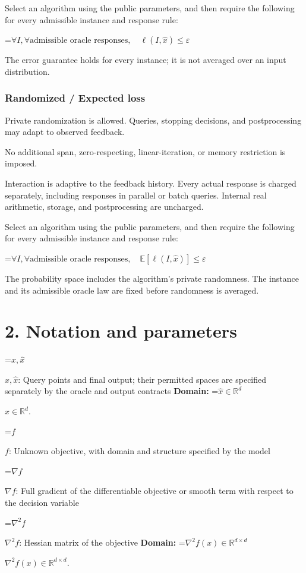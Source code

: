 \documentclass[10pt,a4paper]{article}
\newcommand{\AtlasMath}[1]{\par\begingroup\centering\setbox0=\hbox{$\displaystyle #1$}\ifdim\wd0>1.4\linewidth\typeout{ATLAS WIDE FORMULA: \the\wd0}\fi\ifdim\wd0>\linewidth\resizebox{\linewidth}{!}{\box0}\else\box0\fi\par\endgroup}
\newcommand{\AtlasInlineMath}[1]{\begingroup\setbox0=\hbox{$#1$}\ifdim\wd0>.4\linewidth\endgroup\AtlasMath{#1}\else\endgroup$#1$\fi}
\begin{document}
Select an algorithm using the public parameters, and then require the following for every admissible instance and response rule:


\AtlasMath{\forall I,\forall\text{admissible oracle responses},\quad\ell(I,\widehat{x})\le\varepsilon}


The error guarantee holds for every instance; it is not averaged over an input distribution.

\subsubsection{Randomized / Expected loss}
Private randomization is allowed. Queries, stopping decisions, and postprocessing may adapt to observed feedback.

No additional span, zero-respecting, linear-iteration, or memory restriction is imposed.

Interaction is adaptive to the feedback history. Every actual response is charged separately, including responses in parallel or batch queries. Internal real arithmetic, storage, and postprocessing are uncharged.

Select an algorithm using the public parameters, and then require the following for every admissible instance and response rule:


\AtlasMath{\forall I,\forall\text{admissible oracle responses},\quad\mathbb{E}[\ell(I,\widehat{x})]\le\varepsilon}


The probability space includes the algorithm's private randomness. The instance and its admissible oracle law are fixed before randomness is averaged.

\section{2. Notation and parameters}
\AtlasInlineMath{x,\widehat{x}}: Query points and final output; their permitted spaces are specified separately by the oracle and output contracts \textbf{Domain:} \AtlasInlineMath{\widehat{x}\in \mathbb{R}^d}.

\AtlasInlineMath{f}: Unknown objective, with domain and structure specified by the model

\AtlasInlineMath{\nabla f}: Full gradient of the differentiable objective or smooth term with respect to the decision variable

\AtlasInlineMath{\nabla^2f}: Hessian matrix of the objective \textbf{Domain:} \AtlasInlineMath{\nabla^2f(x)\in\mathbb{R}^{d\times d}}.
\end{document}
